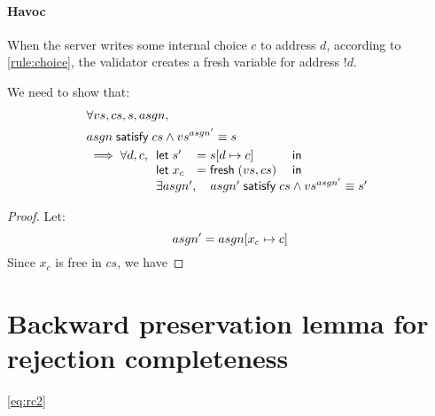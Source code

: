 \paragraph{Havoc}
When the server writes some internal choice $c$ to address $d$,
according to \autoref{rule:choice}, the validator creates a fresh variable for
address $!d$.

We need to show that:
\begin{align*}&\forall vs,cs,s,asgn,\\
&\satisfy{asgn}{cs}\wedge vs^{asgn'}\equiv s\\
&\implies\forall d,c,\begin{array}[t]{lll}
\letin{s'&}{\update{s}{d}{c}&}\\
\letin{x_c&}{\Fresh(vs,cs)&}\\
\multicolumn{3}{l}{\exists asgn',\quad\satisfy{asgn'} cs\wedge vs^{asgn'}\equiv s'}
\end{array}
\end{align*}
\begin{proof}
Let:\[asgn'=asgn[x_c\mapsto c]\]
Since $x_c$ is free in $cs$, we have
\end{proof}






\section{Backward preservation lemma for rejection completeness}
\label{sec:rc2-proof}

\autoref{eq:rc2}
